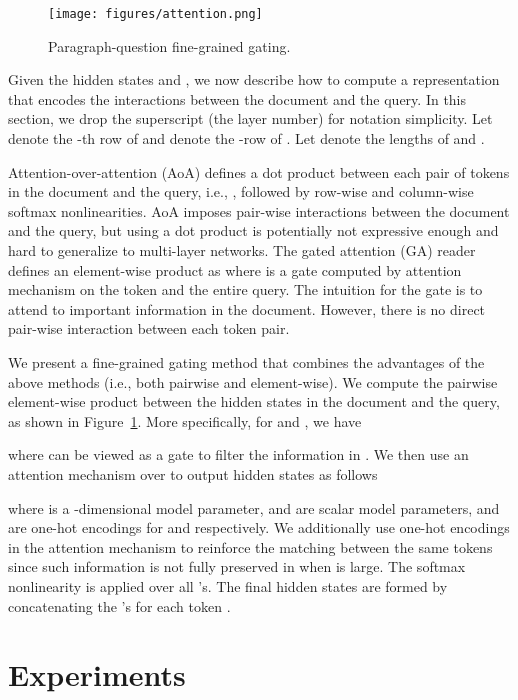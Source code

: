 \documentclass{article} \usepackage{iclr2017_conference,times}
\begin{document}
\begin{figure}[t]
\begin{center}
\texttt{[image: figures/attention.png]}
\end{center}
\caption{\small Paragraph-question fine-grained gating.}
\label{fig:dq}
\end{figure}

Given the hidden states  and , we now describe how to compute a representation  that encodes the interactions between the document and the query. In this section, we drop the superscript  (the layer number) for notation simplicity. Let  denote the -th row of  and  denote the -row of . Let  denote the lengths of  and .

Attention-over-attention (AoA) \citep{cui2016attention} defines a dot product between each pair of tokens in the document and the query, i.e., , followed by row-wise and column-wise softmax nonlinearities. AoA imposes pair-wise interactions between the document and the query, but using a dot product is potentially not expressive enough and hard to generalize to multi-layer networks. The gated attention (GA) reader \citep{dhingra2016gated} defines an element-wise product as  where  is a gate computed by attention mechanism on the token  and the entire query. The intuition for the gate  is to attend to important information in the document. However, there is no direct pair-wise interaction between each token pair.

We present a fine-grained gating method that combines the advantages of the above methods (i.e., both pairwise and element-wise). We compute the pairwise element-wise product between the hidden states in the document and the query, as shown in Figure~\ref{fig:dq}. More specifically, for  and , we have

where  can be viewed as a gate to filter the information in . We then use an attention mechanism over  to output hidden states  as follows

where  is a -dimensional model parameter,  and  are scalar model parameters,  and  are one-hot encodings for  and  respectively. We additionally use one-hot encodings in the attention mechanism to reinforce the matching between the same tokens since such information is not fully preserved in  when  is large. The softmax nonlinearity is applied over all 's. The final hidden states  are formed by concatenating the 's for each token .




 \section{Experiments}
\end{document}
